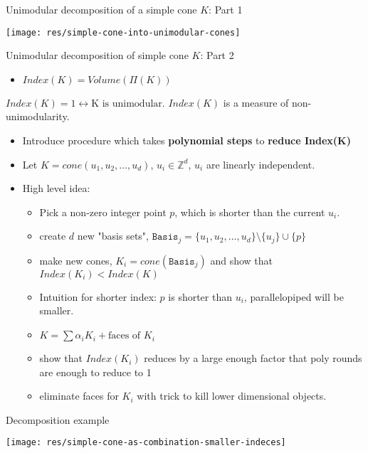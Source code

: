 \documentclass[8pt]{beamer}
\begin{document}
\begin{frame}[label=sec-13]{Unimodular decomposition of a simple cone $K$: Part 1}
\begin{center}
\texttt{[image: res/simple-cone-into-unimodular-cones]}
\end{center}
\end{frame}

\begin{frame}[label=sec-14]{Unimodular decomposition of simple cone $K$: Part 2}
\begin{itemize}
\item $Index(K) = Volume(\Pi(K))$
\end{itemize}

$Index(K) = 1 \leftrightarrow \text{K is unimodular}$. $Index(K)$ is a measure of non-unimodularity.

\begin{itemize}
\item Introduce procedure which takes \textbf{polynomial steps} to \textbf{reduce Index(K)}
\item Let $K = cone(u_1, u_2, \ldots, u_d)$, $u_i \in \mathbb{Z}^d$, $u_i$ are linearly independent.
\item High level idea:
\begin{itemize}
\item Pick a non-zero integer point $p$, which is shorter than the current $u_i$.
\item create $d$ new "basis sets", $\texttt{Basis}_j = \{u_1, u_2 , \ldots, u_d\} \setminus \{u_j\} \cup \{p\}$
\item make new cones, $K_i = cone(\texttt{Basis}_j)$ and show that $Index(K_i) < Index(K)$
\item Intuition for shorter index: $p$ is shorter than $u_i$, parallelopiped will be smaller.
\item $K = \sum \alpha_i K_i + \text{faces of \(K_i \)}$
\item show that $Index(K_i)$ reduces by a large enough factor that poly rounds are enough to reduce to 1
\item eliminate faces for $K_i$ with trick to kill lower dimensional objects.
\end{itemize}
\end{itemize}
\end{frame}

\begin{frame}[label=sec-15]{Decomposition example}
\begin{center}
\texttt{[image: res/simple-cone-as-combination-smaller-indeces]}
\end{center}
\end{frame}
\end{document}
